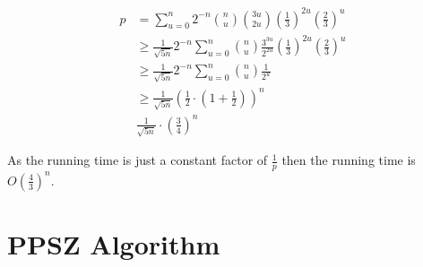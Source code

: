 \documentclass[12pt, a4paper]{article}
\theoremstyle{definition}
\begin{document}
\begin{align}
	p 	&= \sum_{u = 0}^{n} 2^{-n} \binom{n}{u} \binom{3u}{2u} \left( \frac{1}{3} \right)^{2u} \left( \frac{2}{3} \right)^u \\
	 	&\geq \frac{1}{\sqrt{5n}} 2^{-n}\sum_{u = 0}^{n} \binom{n}{u} \frac{3^{3u}}{2^{2u}} \left( \frac{1}{3} \right)^{2u} \left( \frac{2}{3} \right)^u \\
	 	&\geq \frac{1}{\sqrt{5n}} 2^{-n}\sum_{u = 0}^{n} \binom{n}{u} \frac{1}{2^u} \\
	 	&\geq \frac{1}{\sqrt{5n}} \left(\frac{1}{2} \cdot \left(1 + \frac{1}{2} \right) \right)^n \\
	 	& \frac{1}{\sqrt{5n}} \cdot \left( \frac{3}{4} \right)^n
\end{align}

As the running time is just a constant factor of $\frac{1}{p}$ then the running time is $O\left(\frac{4}{3} \right)^n$.
	




\section{PPSZ Algorithm}




\end{document}
